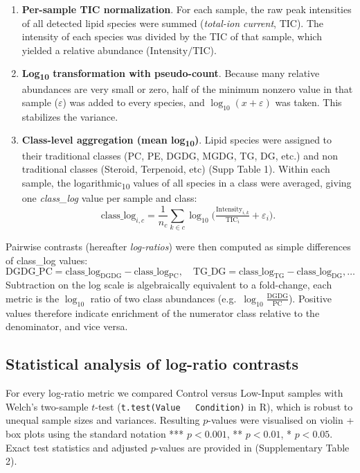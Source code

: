 \documentclass[10pt,letterpaper]{article}
\begin{document}
\begin{enumerate}
  \item \textbf{Per-sample TIC normalization}.  
        For each sample, the raw peak intensities of all detected lipid species were summed (\emph{total-ion current}, TIC).  
        The intensity of each species was divided by the TIC of that sample, which yielded a relative abundance (\(\mathrm{Intensity}/\mathrm{TIC}\)).
  \item \textbf{Log\textsubscript{10} transformation with pseudo-count}.  
        Because many relative abundances are very small or zero, half of the minimum
nonzero value in that sample (\(\varepsilon\)) was added to every species, and \(\log_{10}(x+\varepsilon)\) was taken.
        This stabilizes the variance.
  \item \textbf{Class-level aggregation (mean log\textsubscript{10})}.  
        Lipid species were assigned to their traditional classes (PC, PE, DGDG, MGDG, TG, DG, etc.) and non traditional classes (Steroid, Terpenoid, etc) (Supp Table 1).  
        Within each sample, the logarithmic\textsubscript{10} values of all species in a class were averaged, giving one \emph{class\_log} value per sample and class: \[
          \text{class\_log}_{i,c}=\frac{1}{n_c}\sum_{k\in c}\log_{10}
            \bigl(\tfrac{\mathrm{Intensity}_{i,k}}{\mathrm{TIC}_i}+\varepsilon_i\bigr).
        \]
\end{enumerate}

Pairwise contrasts (hereafter \emph{log-ratios}) were then computed as simple
differences of class\_log values:
\[
  \mathrm{DGDG\_PC} = \text{class\_log}_{\mathrm{DGDG}} -
                      \text{class\_log}_{\mathrm{PC}},
  \quad
  \mathrm{TG\_DG}   = \text{class\_log}_{\mathrm{TG}} -
                      \text{class\_log}_{\mathrm{DG}},
  \ldots
\]
Subtraction on the log scale is algebraically equivalent to a
fold-change, each metric is the \(\log_{10}\) ratio of two class abundances
(e.g.\ \(\log_{10}\tfrac{\text{DGDG}}{\text{PC}}\)).
Positive values therefore indicate enrichment of the numerator class relative
to the denominator, and vice versa.

\subsection*{Statistical analysis of log-ratio contrasts}

For every log-ratio metric we compared Control versus Low-Input samples with
Welch’s two-sample \(t\)-test
(\texttt{t.test(Value ~ Condition)} in \textsf{R}),
which is robust to unequal sample sizes and variances.
Resulting \(p\)-values were visualised on violin + box plots using the standard
notation *** \(p<0.001\), ** \(p<0.01\), * \(p<0.05\).
Exact test statistics and adjusted \(p\)-values are provided in
(Supplementary Table 2).
\end{document}
